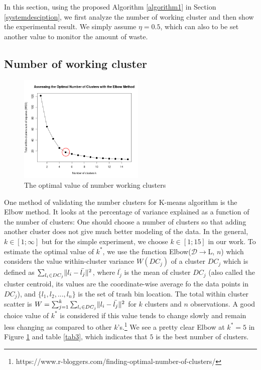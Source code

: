 \documentclass[conference]{IEEEtran}
\DeclarePairedDelimiter{\norm}{\lVert}{\rVert}
\begin{document}
In this section, using the proposed Algorithm \ref{algorithm1} in Section \ref{systemdesciption}, we first analyze the number of working cluster and then show the experimental result. We simply assume $\eta = 0.5$, which can also to be set another value to monitor the amount of waste. 

\subsection{Number of working cluster}

\begin{figure}
	\centering
	\includegraphics[width=6cm]{elbow6}
	\caption{The optimal value of number working clusters}
	\label{fig3}
\end{figure}



One  method of validating the number clusters for K-means algorithm is the Elbow method. It looks at the percentage of variance explained as a function of the number of clusters: One should choose a number of clusters so that adding another cluster does not give much better modeling of the data. In the general, $k \in [1;\infty]$ but for the simple experiment, we choose $k\in[1;15]$ in our work. To estimate the optimal value of $k^*$, we use the function Elbow($\mathcal{D}\rightarrow$L, $n$) which considers the value within-cluster variance $W(DC_j)$ of a cluster $DC_j$ which is defined as $\sum_{l_i\in DC_j}\norm{l_i-\bar{l_j}}^2$, where $\bar{l_j}$ is the mean of cluster $DC_j$ (also called the cluster centroid, its values are the coordinate-wise average fo the data points in $DC_j$), and $\{l_1, l_2,..., l_n\}$ is the set of trash bin location. The total within cluster scatter is $W = \sum_{j=1}^{k}\sum_{l_i\in DC_j}\norm{l_i-\bar{l_j}}^2$ for $k$ clusters and $n$ observations. A good choice value of $k^*$ is considered if this value tends to change slowly and remain less changing as compared to other $k$'s.\footnote{https://www.r-bloggers.com/finding-optimal-number-of-clusters/} We see a pretty clear Elbow at $k^* = 5$ in Figure \ref{fig3} and table \ref{tab3}, which indicates that $5$ is the best number of clusters.
\end{document}
